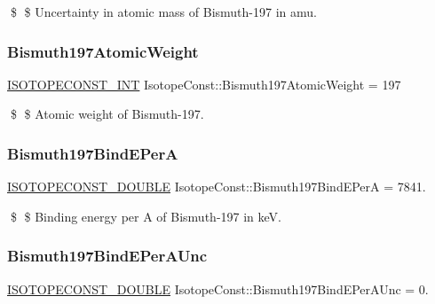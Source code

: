 \$ \$ Uncertainty in atomic mass of Bismuth-\/197 in amu. \mbox{\label{group___isotope_const-_bismuth-_bi197_gaf71bfee282bfdc4373f3b9eb6eb3c2a5}} 
\subsubsection{\texorpdfstring{Bismuth197\+Atomic\+Weight}{Bismuth197AtomicWeight}}
{\footnotesize\ttfamily \mbox{\hyperlink{group___isotope_const-_macros_ga5f18360b3e99483a35c32d789e62621c}{I\+S\+O\+T\+O\+P\+E\+C\+O\+N\+S\+T\+\_\+\+I\+NT}} Isotope\+Const\+::\+Bismuth197\+Atomic\+Weight = 197}

\$ \$ Atomic weight of Bismuth-\/197. \mbox{\label{group___isotope_const-_bismuth-_bi197_ga137e3b267cd4d0738cd38a0def14208a}} 
\subsubsection{\texorpdfstring{Bismuth197\+Bind\+E\+PerA}{Bismuth197BindEPerA}}
{\footnotesize\ttfamily \mbox{\hyperlink{group___isotope_const-_macros_ga8f45a7272ce02c0b4c65c44636ed719a}{I\+S\+O\+T\+O\+P\+E\+C\+O\+N\+S\+T\+\_\+\+D\+O\+U\+B\+LE}} Isotope\+Const\+::\+Bismuth197\+Bind\+E\+PerA = 7841.}

\$ \$ Binding energy per A of Bismuth-\/197 in keV. \mbox{\label{group___isotope_const-_bismuth-_bi197_ga1b702f16bf059f59d27ade0e5ffc90b8}} 
\subsubsection{\texorpdfstring{Bismuth197\+Bind\+E\+Per\+A\+Unc}{Bismuth197BindEPerAUnc}}
{\footnotesize\ttfamily \mbox{\hyperlink{group___isotope_const-_macros_ga8f45a7272ce02c0b4c65c44636ed719a}{I\+S\+O\+T\+O\+P\+E\+C\+O\+N\+S\+T\+\_\+\+D\+O\+U\+B\+LE}} Isotope\+Const\+::\+Bismuth197\+Bind\+E\+Per\+A\+Unc = 0.}

